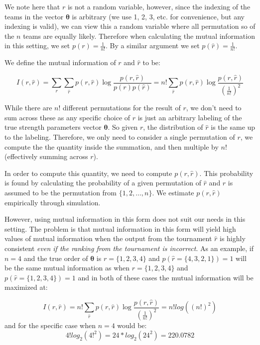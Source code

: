 \documentclass[
  12pt,
]{article}
\begin{document}
We note here that \(r\) is not a random variable, however, since the
indexing of the teams in the vector \(\boldsymbol{\theta}\) is arbitrary
(we use 1, 2, 3, etc. for convenience, but any indexing is valid), we
can view this a random variable where all permutation so of the \(n\)
teams are equally likely. Therefore when calculating the mutual
information in this setting, we set \(p(r) = \frac{1}{n!}\). By a
similar argument we set \(p(\hat{r}) = \frac{1}{n!}\).

We define the mutual information of \(r\) and \(\hat{r}\) to be:

\[
I(r,\hat{r})=\sum_{r}\sum_{\hat{r}}p(r,\hat{r})\log \frac {p(r,\hat{r})}{p(r)p(\hat{r})} = n!\sum_{\hat{r}}p(r,\hat{r})\log \frac {p(r,\hat{r})}{(\frac{1}{n!})^2}
\]

While there are \(n!\) different permutations for the result of \(r\),
we don't need to sum across these as any specific choice of \(r\) is
just an arbitrary labeling of the true strength parameters vector
\(\boldsymbol{\theta}\). So given \(r\), the distribution of \(\hat{r}\)
is the same up to the labeling. Therefore, we only need to consider a
single permutation of \(r\), we compute the the quantity inside the
summation, and then multiple by \(n!\) (effectively summing across
\(r\)).

In order to compute this quantity, we need to compute \(p(r,\hat{r})\).
This probability is found by calculating the probability of a given
permutation of \(\hat{r}\) and \(r\) is assumed to be the permutation
from \(\{1, 2, \ldots, n\}\). We estimate \(p(r,\hat{r})\) empirically
through simulation.

However, using mutual information in this form does not suit our needs
in this setting. The problem is that mutual information in this form
will yield high values of mutual information when the output from the
tournament \(\hat{r}\) is highly consistent \emph{even if the ranking
from the tournament is incorrect}. As an example, if \(n=4\) and the
true order of \(\boldsymbol{\theta}\) is \(r = \{1, 2, 3, 4\}\) and
\(p(\hat{r} = \{4, 3, 2, 1\}) = 1\) will be the same mutual information
as when \(r = \{1, 2, 3, 4\}\) and \(p(\hat{r} = \{1, 2, 3, 4\}) = 1\)
and in both of these cases the mutual information will be maximized at:

\[
I(r,\hat{r})= n!\sum_{\hat{r}}p(r,\hat{r})\log \frac {p(r,\hat{r})}{\left(\frac{1}{n!}\right)^2} = n! log((n!)^2)
\] and for the specific case when \(n=4\) would be: \[
4! log_2(4!^2) = 24*log_2(24^2) = 220.0782
\]
\end{document}
